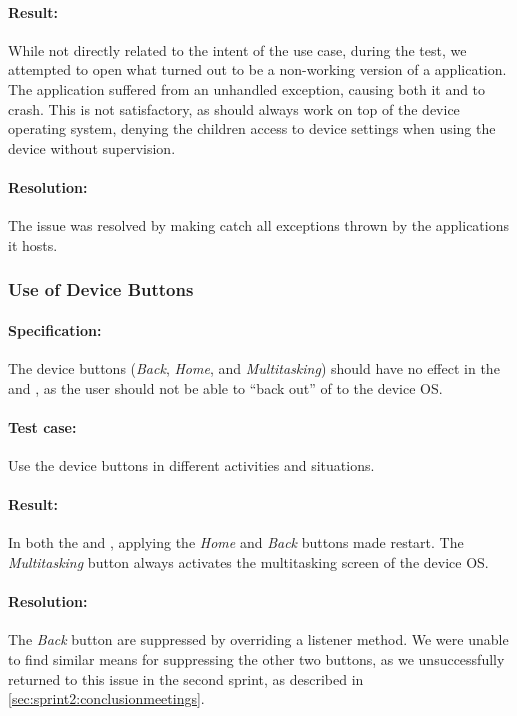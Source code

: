 \paragraph{Result:} While not directly related to the intent of the use case, during the test, we attempted to open what turned out to be a non-working version of a \giraf application. 
The application suffered from an unhandled exception, causing both it and \launcher to crash. 
This is not satisfactory, as \launcher should always work on top of the device operating system, denying the children access to device settings when using the device without supervision.
\paragraph{Resolution:} The issue was resolved by making \launcher catch all exceptions thrown by the \giraf applications it hosts.


\subsubsection{Use of Device Buttons}

\paragraph{Specification:} The device buttons (\textit{Back}, \textit{Home}, and \textit{Multitasking}) should have no effect in the \mainactivity and \authenticationactivity, as the user should not be able to ``back out'' of \launcher to the device OS.
\paragraph{Test case:} Use the device buttons in different activities and situations.
\paragraph{Result:} In both the \mainactivity and \authenticationactivity, applying the \textit{Home} and \textit{Back} buttons made \launcher restart. 
The \textit{Multitasking} button always activates the multitasking screen of the device OS.
\paragraph{Resolution:} The \textit{Back} button are suppressed by overriding a listener method.
We were unable to find similar means for suppressing the other two buttons, as we unsuccessfully returned to this issue in the second sprint, as described in \cref{sec:sprint2:conclusionmeetings}.